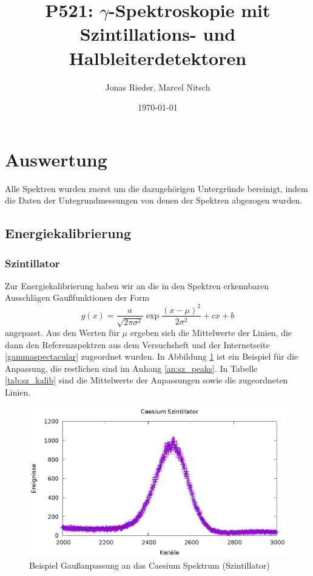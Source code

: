 \documentclass[12pt,a4paper,titlepage]{article}
\author{Jonas Rieder, Marcel Nitsch}
\date{\today}
\title{P521: $\gamma$-Spektroskopie mit Szintillations- und Halbleiterdetektoren}
\begin{document}
\section{Auswertung}

Alle Spektren wurden zuerst um die dazugehörigen Untergründe bereinigt, indem die Daten der Untegrundmessungen von denen der Spektren abgezogen wurden.

\subsection{Energiekalibrierung}

\subsubsection{Szintillator}

Zur Energiekalibrierung haben wir an die in den Spektren erkennbaren Ausschlägen Gaußfunktionen der Form
\begin{equation}
g(x) = \frac{a}{\sqrt{2\pi\sigma^2}}\exp{\frac{\left(x-\mu\right)^2}{2\sigma^2}} + cx + b
\end{equation}
angepasst. Aus den Werten für $\mu$ ergeben sich die Mittelwerte der Linien, die dann den Referenzspektren aus dem Versuchsheft und der Internetseite \ref{gammaspectacular} zugeordnet wurden. In Abbildung \ref{fig:sz_bsp} ist ein Beispiel für die Anpassung, die restlichen sind im Anhang \ref{an:sz_peaks}. In Tabelle \ref{tab:sz_kalib} sind die Mittelwerte der Anpassungen sowie die zugeordneten Linien.

\begin{figure}
\includegraphics{caesium_sz}
\caption{Beispiel Gaußanpassung an das Caesium Spektrum (Szintillator)}
\label{fig:sz_bsp}
\end{figure}
\end{document}
